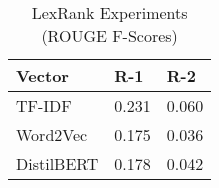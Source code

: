 \begin{table}[H]
\centering
\caption{LexRank Experiments (ROUGE F-Scores)}
\begin{tabular}{|l|p{1cm}|p{1cm}|}
  \hline
    Vector  & R-1 & R-2 \\ \hline
    TF-IDF & 0.231 & 0.060 \\
    Word2Vec & 0.175 & 0.036 \\
    DistilBERT & 0.178 & 0.042 \\ \hline

\end{tabular}
\label{tab:lexrank_expt}
\end{table}